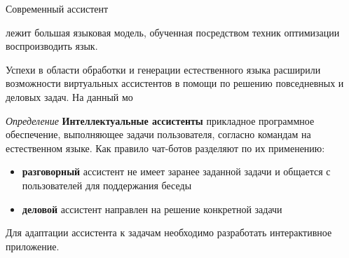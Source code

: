 
Современный ассистент

лежит большая языковая модель, обученная посредством техник оптимизации воспроизводить язык.

Успехи в области обработки и генерации естественного языка расширили
возможности виртуальных ассистентов в помощи по решению повседневных и деловых задач. На данный мо


\textit{Определение} \textbf{Интеллектуальные ассистенты} прикладное программное обеспечение, выполняющее задачи пользователя, согласно командам на естественном языке. 
Как правило чат-ботов разделяют по их применению:
\begin{itemize}
    \item \textbf{разговорный} ассистент не имеет заранее заданной задачи и общается с пользователей для поддержания беседы
    \item \textbf{деловой} ассистент направлен на решение конкретной задачи
\end{itemize}


Для адаптации ассистента к задачам необходимо разработать интерактивное приложение.




